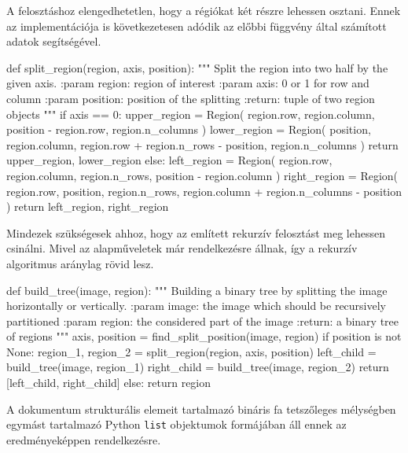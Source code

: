 A felosztáshoz elengedhetetlen, hogy a régiókat két részre lehessen osztani.
Ennek az implementációja is következetesen adódik az előbbi függvény által számított adatok segítségével.
\begin{python}
def split_region(region, axis, position):
    """
    Split the region into two half by the given axis.
    :param region: region of interest
    :param axis: 0 or 1 for row and column
    :param position: position of the splitting
    :return: tuple of two region objects
    """
    if axis == 0:
        upper_region = Region(
            region.row, region.column,
            position - region.row, region.n_columns
        )
        lower_region = Region(
            position, region.column,
            region.row + region.n_rows - position, region.n_columns
        )
        return upper_region, lower_region
    else:
        left_region = Region(
            region.row, region.column,
            region.n_rows, position - region.column
        )
        right_region = Region(
            region.row, position,
            region.n_rows, region.column + region.n_columns - position
        )
        return left_region, right_region
\end{python}
Mindezek szükségesek ahhoz, hogy az említett rekurzív felosztást meg lehessen csinálni.
Mivel az alapműveletek már rendelkezésre állnak, így a rekurzív algoritmus aránylag rövid lesz.
\begin{python}
def build_tree(image, region):
    """
    Building a binary tree by splitting the image
    horizontally or vertically.
    :param image: the image which should be recursively partitioned
    :param region: the considered part of the image
    :return: a binary tree of regions
    """
    axis, position = find_split_position(image, region)
    if position is not None:
        region_1, region_2 = split_region(region, axis, position)
        left_child = build_tree(image, region_1)
        right_child = build_tree(image, region_2)
        return [left_child, right_child]
    else:
        return region
\end{python}
A dokumentum strukturális elemeit tartalmazó bináris fa tetszőleges mélységben egymást tartalmazó Python \texttt{list} objektumok formájában áll ennek az eredményeképpen rendelkezésre.

